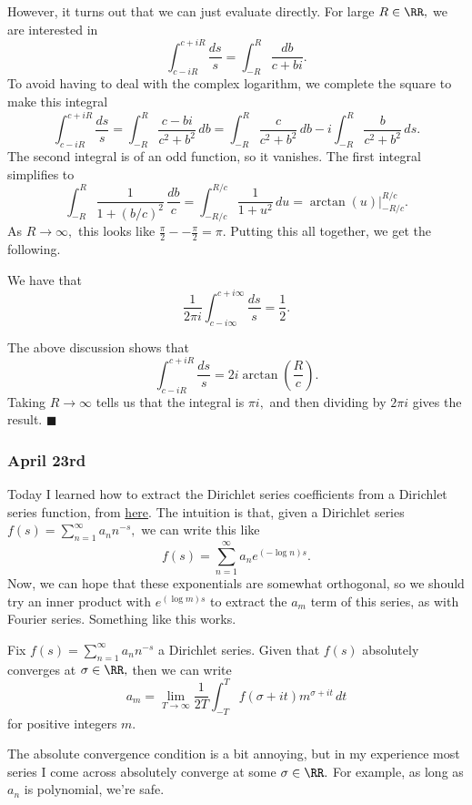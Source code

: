 However, it turns out that we can just evaluate directly. For large $R\in\RR,$ we are interested in
\[\int_{c-iR}^{c+iR}\frac{ds}s=\int_{-R}^R\frac{db}{c+bi}.\]
To avoid having to deal with the complex logarithm, we complete the square to make this integral
\[\int_{c-iR}^{c+iR}\frac{ds}s=\int_{-R}^R\frac{c-bi}{c^2+b^2}\,db=\int_{-R}^R\frac c{c^2+b^2}\,db-i\int_{-R}^R\frac b{c^2+b^2}\,ds.\]
The second integral is of an odd function, so it vanishes. The first integral simplifies to
\[\int_{-R}^R\frac1{1+(b/c)^2}\,\frac{db}c=\int_{-R/c}^{R/c}\frac1{1+u^2}\,du=\arctan(u)\bigg|_{-R/c}^{R/c}.\]
As $R\to\infty,$ this looks like $\frac\pi2--\frac\pi2=\pi.$ Putting this all together, we get the following.
\begin{proposition}
    We have that
    \[\frac1{2\pi i}\int_{c-i\infty}^{c+i\infty}\frac{ds}s=\frac12.\]
\end{proposition}
The above discussion shows that
\[\int_{c-iR}^{c+iR}\frac{ds}s=2i\arctan\left(\frac Rc\right).\]
Taking $R\to\infty$ tells us that the integral is $\pi i,$ and then dividing by $2\pi i$ gives the result. $\blacksquare$

\subsubsection{April 23rd}
Today I learned how to extract the Dirichlet series coefficients from a Dirichlet series function, from \href{https://mathoverflow.net/q/30975}{here}. The intuition is that, given a Dirichlet series $f(s)=\sum_{n=1}^\infty a_nn^{-s},$ we can write this like
\[f(s)=\sum_{n=1}^\infty a_ne^{(-\log n)s}.\]
Now, we can hope that these exponentials are somewhat orthogonal, so we should try an inner product with $e^{(\log m)s}$ to extract the $a_m$ term of this series, as with Fourier series. Something like this works.
\begin{proposition}
    Fix $f(s)=\sum_{n=1}^\infty a_nn^{-s}$ a Dirichlet series. Given that $f(s)$ absolutely converges at $\sigma\in\RR,$ then we can write
    \[a_m=\lim_{T\to\infty}\frac1{2T}\int_{-T}^Tf(\sigma+it)m^{\sigma+it}\,dt\]
    for positive integers $m.$
\end{proposition}
The absolute convergence condition is a bit annoying, but in my experience most series I come across absolutely converge at some $\sigma\in\RR.$ For example, as long as $a_n$ is polynomial, we're safe.

